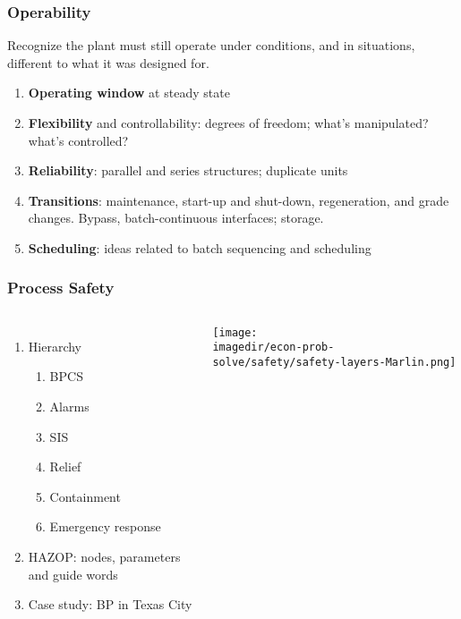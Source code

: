 \begin{frame}\frametitle{Operability}
	\begin{exampleblock}{}
		Recognize the plant must still operate under conditions, and in situations, different to what it was designed for.
	\end{exampleblock}
	\begin{enumerate}
		\item	\textbf{Operating window} at steady state
		\item	\textbf{Flexibility} and controllability: degrees of freedom; what's manipulated? what's controlled?
		\item	\textbf{Reliability}: parallel and series structures; duplicate units
		\item	\textbf{Transitions}: maintenance, start-up and shut-down, regeneration, and grade changes. Bypass, batch-continuous interfaces; storage.
		\item	\textbf{Scheduling}: ideas related to batch sequencing and scheduling
	\end{enumerate}
\end{frame}

\begin{frame}\frametitle{Process Safety}
	\begin{columns}[t]
			\begin{enumerate}
				\item	Hierarchy
				\begin{enumerate}
					\item	BPCS
					\item	Alarms
					\item	SIS
					\item	Relief
					\item	Containment
					\item	Emergency response
				\end{enumerate}
				\item	HAZOP: nodes, parameters and guide words
				\item	Case study: BP in Texas City
			\end{enumerate}
			\vspace{-20pt}
			\begin{center}
				\texttt{[image: \\imagedir/econ-prob-solve/safety/safety-layers-Marlin.png]}
			\end{center}
	\end{columns}
\end{frame}

